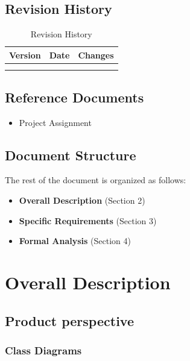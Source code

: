 \documentclass {article}
\begin{document}
	\subsection{Revision History}
	
	\begin{table}[ht]
		\centering
		\begin{tabular}{ccc} 
		Version & Date & Changes  \\ 
		\hline
		 \\
		 \\
		\end{tabular}
		\caption{Revision History}
		\label{default}
	\end{table}
	
	\subsection{Reference Documents}
		
		\begin{itemize}
   	
			 \item Project Assignment
			\end{itemize}

	\subsection{Document Structure}
			The rest of the document is organized as follows:
				\begin{itemize}
					\item {\bf Overall Description} (Section 2) 					
					\item {\bf Specific Requirements} (Section 3) 
					\item {\bf Formal Analysis} (Section 4)				
					\end{itemize}

\pagebreak	
	
\section{Overall Description}
	\subsection{Product perspective}
	
	\subsubsection{Class Diagrams}
		
\end{document}
